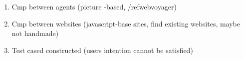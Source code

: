 \begin{enumerate}
    \item Cmp between agents (picture -based, /ref{webvoyager})
    \item Cmp between websites (javascript-base sites, find existing websites, maybe not handmade) 
    \item Test cased constructed (users intention cannot be satisfied)
\end{enumerate}